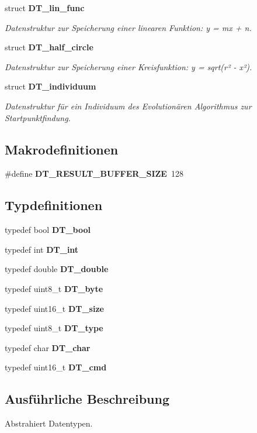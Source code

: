 \begin{DoxyCompactItemize}
struct {\bf DT\_\-lin\_\-func}
\begin{DoxyCompactList}\small\item\em Datenstruktur zur Speicherung einer linearen Funktion: y = mx + n. \item\end{DoxyCompactList}\item 
struct {\bf DT\_\-half\_\-circle}
\begin{DoxyCompactList}\small\item\em Datenstruktur zur Speicherung einer Kreisfunktion: y = sqrt(r² -\/ x²). \item\end{DoxyCompactList}\item 
struct {\bf DT\_\-individuum}
\begin{DoxyCompactList}\small\item\em Datenstruktur für ein Individuum des Evolutionären Algorithmus zur Startpunktfindung. \item\end{DoxyCompactList}\end{DoxyCompactItemize}
\subsection*{Makrodefinitionen}
\begin{DoxyCompactItemize}
\item 
\#define {\bf DT\_\-RESULT\_\-BUFFER\_\-SIZE}~128
\end{DoxyCompactItemize}
\subsection*{Typdefinitionen}
\begin{DoxyCompactItemize}
\item 
typedef bool {\bf DT\_\-bool}
\item 
typedef int {\bf DT\_\-int}
\item 
typedef double {\bf DT\_\-double}
\item 
typedef uint8\_\-t {\bf DT\_\-byte}
\item 
typedef uint16\_\-t {\bf DT\_\-size}
\item 
typedef uint8\_\-t {\bf DT\_\-type}
\item 
typedef char {\bf DT\_\-char}
\item 
typedef uint16\_\-t {\bf DT\_\-cmd}
\end{DoxyCompactItemize}


\subsection{Ausführliche Beschreibung}
Abstrahiert Datentypen. 

